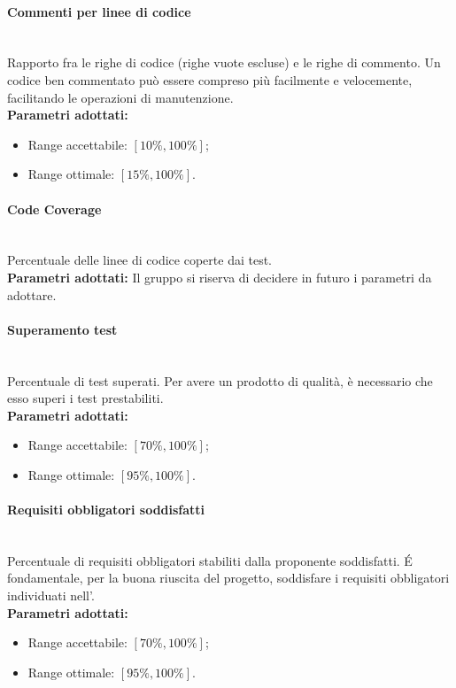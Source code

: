 \paragraph{Commenti per linee di codice}\mbox{}\\[0,3cm]
Rapporto fra le righe di codice (righe vuote escluse) e le righe di commento. Un codice ben commentato può essere compreso più facilmente e velocemente, facilitando le operazioni di manutenzione.\\[0,2cm]
\textbf{Parametri adottati:}
\begin{itemize}
	\item Range accettabile: $[10\%,100\%]$;
	\item Range ottimale: $[15\%,100\%]$.
\end{itemize}

\paragraph{Code Coverage}\mbox{}\\[0,3cm]
Percentuale delle linee di codice coperte dai test.\\[0,2cm]
\textbf{Parametri adottati:\newline}
Il gruppo \gruppo \space si riserva di decidere in futuro i parametri da adottare.

\paragraph{Superamento test}\mbox{}\\[0,3cm]
Percentuale di test superati. Per avere un prodotto di qualità, è necessario che esso superi i test prestabiliti.\\[0,2cm]
\textbf{Parametri adottati:}
\begin{itemize}
	\item Range accettabile: $[70\%,100\%]$;
	\item Range ottimale: $[95\%,100\%]$.
\end{itemize}

\paragraph{Requisiti obbligatori soddisfatti}\mbox{}\\[0,3cm]
Percentuale di requisiti obbligatori stabiliti dalla proponente soddisfatti. \'E fondamentale, per la buona riuscita del progetto, soddisfare i requisiti obbligatori individuati nell'\AdR .\\[0,2cm]
\textbf{Parametri adottati:}
\begin{itemize}
	\item Range accettabile: $[70\%,100\%]$;
	\item Range ottimale: $[95\%,100\%]$.
\end{itemize}
	

